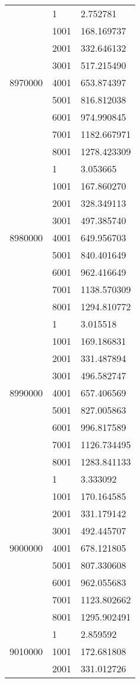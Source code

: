 \begin{table}[htb!]
\begin{tabular}{lll}
\multirow[c]{9}{*}{8970000} & 1 & 2.752781 \\
 & 1001 & 168.169737 \\
 & 2001 & 332.646132 \\
 & 3001 & 517.215490 \\
 & 4001 & 653.874397 \\
 & 5001 & 816.812038 \\
 & 6001 & 974.990845 \\
 & 7001 & 1182.667971 \\
 & 8001 & 1278.423309 \\
\multirow[c]{9}{*}{8980000} & 1 & 3.053665 \\
 & 1001 & 167.860270 \\
 & 2001 & 328.349113 \\
 & 3001 & 497.385740 \\
 & 4001 & 649.956703 \\
 & 5001 & 840.401649 \\
 & 6001 & 962.416649 \\
 & 7001 & 1138.570309 \\
 & 8001 & 1294.810772 \\
\multirow[c]{9}{*}{8990000} & 1 & 3.015518 \\
 & 1001 & 169.186831 \\
 & 2001 & 331.487894 \\
 & 3001 & 496.582747 \\
 & 4001 & 657.406569 \\
 & 5001 & 827.005863 \\
 & 6001 & 996.817589 \\
 & 7001 & 1126.734495 \\
 & 8001 & 1283.841133 \\
\multirow[c]{9}{*}{9000000} & 1 & 3.333092 \\
 & 1001 & 170.164585 \\
 & 2001 & 331.179142 \\
 & 3001 & 492.445707 \\
 & 4001 & 678.121805 \\
 & 5001 & 807.330608 \\
 & 6001 & 962.055683 \\
 & 7001 & 1123.802662 \\
 & 8001 & 1295.902491 \\
\multirow[c]{9}{*}{9010000} & 1 & 2.859592 \\
 & 1001 & 172.681808 \\
 & 2001 & 331.012726 \\

\end{tabular}
\end{table}
